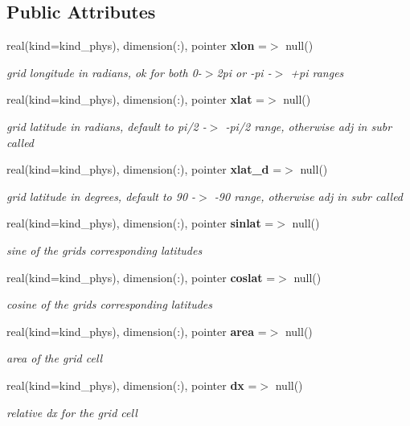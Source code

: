 \subsection*{Public Attributes}
\begin{DoxyCompactItemize}
\item 
real(kind=kind\+\_\+phys), dimension(\+:), pointer \textbf{ xlon} =$>$ null()
\begin{DoxyCompactList}\small\item\em grid longitude in radians, ok for both 0-\/$>$2pi or -\/pi -\/$>$ +pi ranges \end{DoxyCompactList}\item 
real(kind=kind\+\_\+phys), dimension(\+:), pointer \textbf{ xlat} =$>$ null()
\begin{DoxyCompactList}\small\item\em grid latitude in radians, default to pi/2 -\/$>$ -\/pi/2 range, otherwise adj in subr called \end{DoxyCompactList}\item 
real(kind=kind\+\_\+phys), dimension(\+:), pointer \textbf{ xlat\+\_\+d} =$>$ null()
\begin{DoxyCompactList}\small\item\em grid latitude in degrees, default to 90 -\/$>$ -\/90 range, otherwise adj in subr called \end{DoxyCompactList}\item 
real(kind=kind\+\_\+phys), dimension(\+:), pointer \textbf{ sinlat} =$>$ null()
\begin{DoxyCompactList}\small\item\em sine of the grids corresponding latitudes \end{DoxyCompactList}\item 
real(kind=kind\+\_\+phys), dimension(\+:), pointer \textbf{ coslat} =$>$ null()
\begin{DoxyCompactList}\small\item\em cosine of the grids corresponding latitudes \end{DoxyCompactList}\item 
real(kind=kind\+\_\+phys), dimension(\+:), pointer \textbf{ area} =$>$ null()
\begin{DoxyCompactList}\small\item\em area of the grid cell \end{DoxyCompactList}\item 
real(kind=kind\+\_\+phys), dimension(\+:), pointer \textbf{ dx} =$>$ null()
\begin{DoxyCompactList}\small\item\em relative dx for the grid cell \end{DoxyCompactList}\item 

\end{DoxyCompactItemize}
